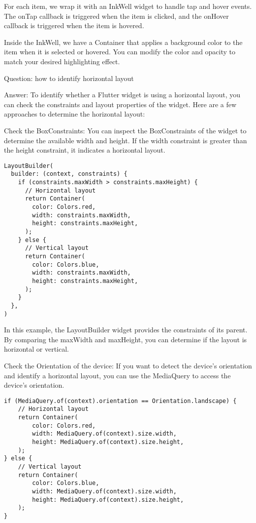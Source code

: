 For each item, we wrap it with an InkWell widget to handle tap and hover events. The onTap callback is triggered 
when the item is clicked, and the onHover callback is triggered when the item is hovered.

Inside the InkWell, we have a Container that applies a background color to the item when it is selected or hovered. 
You can modify the color and opacity to match your desired highlighting effect.

Question: how to identify horizontal layout

Answer: To identify whether a Flutter widget is using a horizontal layout, you can check the constraints and layout 
properties of the widget. Here are a few approaches to determine the horizontal layout:

Check the BoxConstraints: You can inspect the BoxConstraints of the widget to determine the available width and 
height. If the width constraint is greater than the height constraint, it indicates a horizontal layout.

\begin{lstlisting}
LayoutBuilder(
  builder: (context, constraints) {
    if (constraints.maxWidth > constraints.maxHeight) {
      // Horizontal layout
      return Container(
        color: Colors.red,
        width: constraints.maxWidth,
        height: constraints.maxHeight,
      );
    } else {
      // Vertical layout
      return Container(
        color: Colors.blue,
        width: constraints.maxWidth,
        height: constraints.maxHeight,
      );
    }
  },
)
\end{lstlisting}

In this example, the LayoutBuilder widget provides the constraints of its parent. By comparing the maxWidth and 
maxHeight, you can determine if the layout is horizontal or vertical.

Check the Orientation of the device: If you want to detect the device's orientation and identify a horizontal 
layout, you can use the MediaQuery to access the device's orientation. 

\begin{lstlisting}
if (MediaQuery.of(context).orientation == Orientation.landscape) {
    // Horizontal layout
    return Container(
        color: Colors.red,
        width: MediaQuery.of(context).size.width,
        height: MediaQuery.of(context).size.height,
    );
} else {
    // Vertical layout
    return Container(
        color: Colors.blue,
        width: MediaQuery.of(context).size.width,
        height: MediaQuery.of(context).size.height,
    );
}
\end{lstlisting}

